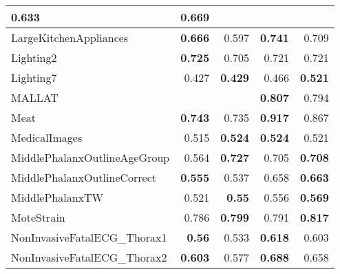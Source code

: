 \begin{longtable}{|l||r|r||r|r|}
0.633 &
\cellcolor[rgb]{ .973,  .796,  .678} \textbf{0.669}
\bigstrut\\
\hline
\rowcolor[rgb]{ .851,  .851,  .851} LargeKitchenAppliances &
\cellcolor[rgb]{ .973,  .796,  .678} \textbf{0.666} &
0.597 &
\cellcolor[rgb]{ .973,  .796,  .678} \textbf{0.741} &
0.709
\bigstrut\\
\hline
Lighting2 &
\cellcolor[rgb]{ .973,  .796,  .678} \textbf{0.725} &
0.705 &
0.721 &
0.721
\bigstrut\\
\hline
\rowcolor[rgb]{ .851,  .851,  .851} Lighting7 &
0.427 &
\cellcolor[rgb]{ .973,  .796,  .678} \textbf{0.429} &
0.466 &
\cellcolor[rgb]{ .973,  .796,  .678} \textbf{0.521}
\bigstrut\\
\hline
MALLAT &
&
&
\cellcolor[rgb]{ .973,  .796,  .678} \textbf{0.807} &
0.794
\bigstrut\\
\hline
\rowcolor[rgb]{ .851,  .851,  .851} Meat &
\cellcolor[rgb]{ .973,  .796,  .678} \textbf{0.743} &
0.735 &
\cellcolor[rgb]{ .973,  .796,  .678} \textbf{0.917} &
0.867
\bigstrut\\
\hline
MedicalImages &
0.515 &
\cellcolor[rgb]{ .973,  .796,  .678} \textbf{0.524} &
\cellcolor[rgb]{ .973,  .796,  .678} \textbf{0.524} &
0.521
\bigstrut\\
\hline
\rowcolor[rgb]{ .851,  .851,  .851} MiddlePhalanxOutlineAgeGroup &
0.564 &
\cellcolor[rgb]{ .973,  .796,  .678} \textbf{0.727} &
0.705 &
\cellcolor[rgb]{ .973,  .796,  .678} \textbf{0.708}
\bigstrut\\
\hline
MiddlePhalanxOutlineCorrect &
\cellcolor[rgb]{ .973,  .796,  .678} \textbf{0.555} &
0.537 &
0.658 &
\cellcolor[rgb]{ .973,  .796,  .678} \textbf{0.663}
\bigstrut\\
\hline
\rowcolor[rgb]{ .851,  .851,  .851} MiddlePhalanxTW &
0.521 &
\cellcolor[rgb]{ .973,  .796,  .678} \textbf{0.55} &
0.556 &
\cellcolor[rgb]{ .973,  .796,  .678} \textbf{0.569}
\bigstrut\\
\hline
MoteStrain &
0.786 &
\cellcolor[rgb]{ .973,  .796,  .678} \textbf{0.799} &
0.791 &
\cellcolor[rgb]{ .973,  .796,  .678} \textbf{0.817}
\bigstrut\\
\hline
\rowcolor[rgb]{ .851,  .851,  .851} NonInvasiveFatalECG\_Thorax1 &
\cellcolor[rgb]{ .973,  .796,  .678} \textbf{0.56} &
0.533 &
\cellcolor[rgb]{ .973,  .796,  .678} \textbf{0.618} &
0.603
\bigstrut\\
\hline
NonInvasiveFatalECG\_Thorax2 &
\cellcolor[rgb]{ .973,  .796,  .678} \textbf{0.603} &
0.577 &
\cellcolor[rgb]{ .973,  .796,  .678} \textbf{0.688} &
0.658
\bigstrut\\

\end{longtable}
